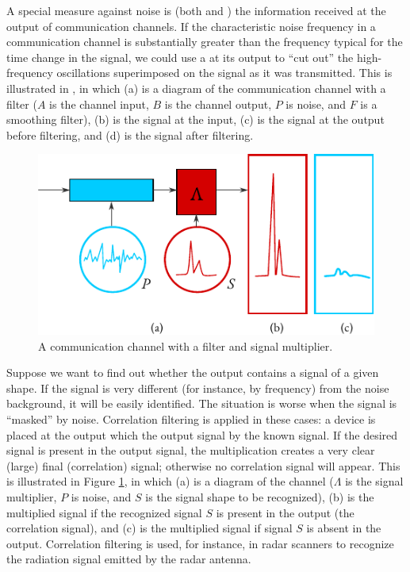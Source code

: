 A special measure against noise is  (both  and
) the information received at the output of communication
channels. If the characteristic noise frequency in a communication
channel is substantially greater than the frequency typical for the time
change in the signal, we could use a  at its output to ``cut out'' the high-frequency oscillations superimposed on the signal as it was
transmitted. This is illustrated in , in which (a) is a diagram of the communication channel with a filter ($A$ is the channel input, $B$ is the
channel output, $P$ is noise, and $F$ is a smoothing filter), (b) is the signal at the input, (c) is the signal at the output before filtering, and (d) is the signal after filtering.
\begin{figure}[!ht]
 \centering
 \includegraphics[width=0.8\linewidth]{figures/noise2.pdf}
\caption{A communication channel with a filter and signal multiplier.\label{noise2}}
 \end{figure}
 
Suppose we want to find out whether the output contains a signal of
a given shape. If the signal is very different (for instance, by frequency)
from the noise background, it will be easily identified. The situation is
worse when the signal is ``masked'' by noise. Correlation filtering is
applied in these cases: a device is placed at the output which 
the output signal by the known signal. If the desired signal is present in
the output signal, the multiplication creates a very clear (large) final
(correlation) signal; otherwise no correlation signal will appear. This is
illustrated in Figure \ref{noise2}, in which (a) is a diagram of the channel ($\Lambda$ is the signal multiplier, $P$ is noise, and $S$ is the signal shape to be recognized), (b) is the multiplied signal if the recognized signal $S$ is present in the output (the correlation signal), and (c) is the multiplied signal if signal $S$ is absent in the output. Correlation filtering is used, for instance, in radar scanners to recognize the radiation signal emitted by the radar antenna.

